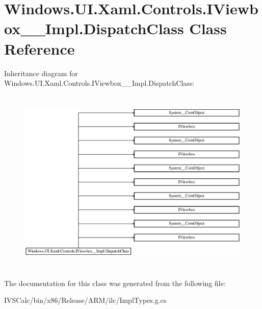 \hypertarget{class_windows_1_1_u_i_1_1_xaml_1_1_controls_1_1_i_viewbox_____impl_1_1_dispatch_class}{}\section{Windows.\+U\+I.\+Xaml.\+Controls.\+I\+Viewbox\+\_\+\+\_\+\+Impl.\+Dispatch\+Class Class Reference}
\label{class_windows_1_1_u_i_1_1_xaml_1_1_controls_1_1_i_viewbox_____impl_1_1_dispatch_class}
Inheritance diagram for Windows.\+U\+I.\+Xaml.\+Controls.\+I\+Viewbox\+\_\+\+\_\+\+Impl.\+Dispatch\+Class\+:\begin{figure}[H]
\begin{center}
\leavevmode
\includegraphics[height=8.979592cm]{class_windows_1_1_u_i_1_1_xaml_1_1_controls_1_1_i_viewbox_____impl_1_1_dispatch_class}
\end{center}
\end{figure}


The documentation for this class was generated from the following file\+:\begin{DoxyCompactItemize}
\item 
I\+V\+S\+Calc/bin/x86/\+Release/\+A\+R\+M/ilc/Impl\+Types.\+g.\+cs\end{DoxyCompactItemize}
